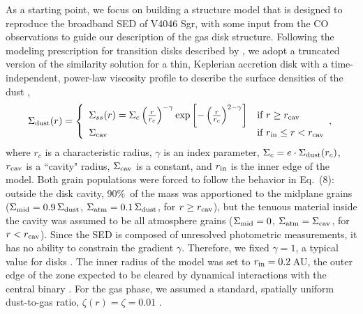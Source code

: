 {As a starting point, we focus on building a structure model that is designed to
reproduce the broadband SED of V4046 Sgr, with some input from the CO
observations to guide our description of the gas disk structure.  Following the
modeling prescription for transition disks described by \citet{andrews11}, we
adopt a truncated version of the \citet{lynden-bell74} similarity solution for
a thin, Keplerian accretion disk with a time-independent, power-law viscosity
profile to describe the surface densities of the dust \citep[see
also][]{hartmann98},
\begin{equation}
 \Sigma_{\rm dust}(r) = \left\{
\begin{array}{ll}
\Sigma_{ss}(r) = \Sigma_c \left(\frac{r}{r_c}\right)^{-\gamma} \exp \left[-\left(\frac{r}{r_c}\right)^{2-\gamma}\right]  & \mbox{if $r \ge r_{\rm cav}$} \\
\Sigma_{\rm cav} & \mbox{if $r_{\rm in} \le r < r_{\rm cav}$} 
\end{array},
\right. 
\end{equation}
where $r_c$ is a characteristic radius, $\gamma$ is an index parameter, 
$\Sigma_c = e \cdot \Sigma_{\rm dust}(r_c)$, $r_{\rm cav}$ is a ``cavity" 
radius, $\Sigma_{\rm cav}$ is a constant, and $r_{\rm in}$ is the inner edge of
the model.  Both grain populations were forced to follow the behavior in 
Eq.~(8): outside the disk cavity, 90\%\ of the mass was apportioned to the
midplane grains ($\Sigma_{\rm mid} = 0.9\,\Sigma_{\rm dust}$, $\Sigma_{\rm atm} 
= 0.1\,\Sigma_{\rm dust}$, for $r \ge r_{\rm cav}$), but the tenuous material
inside the cavity was assumed to be all atmosphere grains ($\Sigma_{\rm mid} = 
0$, $\Sigma_{\rm atm} = \Sigma_{\rm cav}$, for $r < r_{\rm cav}$).  Since the
SED is composed of unresolved photometric measurements, it has no ability to
constrain the gradient $\gamma$.  Therefore, we fixed $\gamma = 1$, a typical
value for disks \citep{andrews09,andrews10}.  The inner radius of the model was
set to $r_{\rm in} = 0.2$\,AU, the outer edge of the zone expected to be
cleared by dynamical interactions with the central binary
\citep{artymowicz94}.  For the gas phase, we assumed a standard, spatially 
uniform dust-to-gas ratio, $\zeta(r) = \zeta = 0.01$ 
\citep{pollack94,dalessio01}.

}
